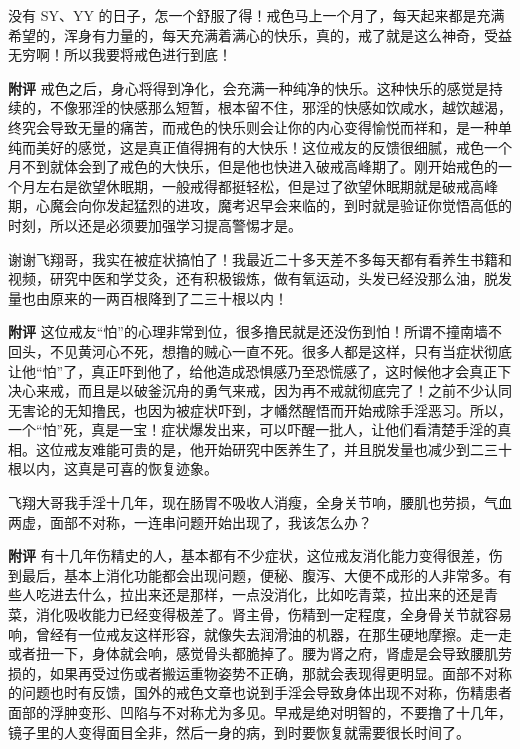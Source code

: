 \begin{case}
    没有 SY、YY 的日子，怎一个舒服了得！戒色马上一个月了，每天起来都是充满希望的，浑身有力量的，每天充满着满心的快乐，真的，戒了就是这么神奇，受益无穷啊！所以我要将戒色进行到底！

    \textbf{附评} 戒色之后，身心将得到净化，会充满一种纯净的快乐。这种快乐的感觉是持续的，不像邪淫的快感那么短暂，根本留不住，邪淫的快感如饮咸水，越饮越渴，终究会导致无量的痛苦，而戒色的快乐则会让你的内心变得愉悦而祥和，是一种单纯而美好的感觉，这是真正值得拥有的大快乐！这位戒友的反馈很细腻，戒色一个月不到就体会到了戒色的大快乐，但是他也快进入破戒高峰期了。刚开始戒色的一个月左右是欲望休眠期，一般戒得都挺轻松，但是过了欲望休眠期就是破戒高峰期，心魔会向你发起猛烈的进攻，魔考迟早会来临的，到时就是验证你觉悟高低的时刻，所以还是必须要加强学习提高警惕才是。
\end{case}

\begin{case}
    谢谢飞翔哥，我实在被症状搞怕了！我最近二十多天差不多每天都有看养生书籍和视频，研究中医和学艾灸，还有积极锻炼，做有氧运动，头发已经没那么油，脱发量也由原来的一两百根降到了二三十根以内！

    \textbf{附评} 这位戒友“怕”的心理非常到位，很多撸民就是还没伤到怕！所谓不撞南墙不回头，不见黄河心不死，想撸的贼心一直不死。很多人都是这样，只有当症状彻底让他“怕”了，真正吓到他了，给他造成恐惧感乃至恐慌感了，这时候他才会真正下决心来戒，而且是以破釜沉舟的勇气来戒，因为再不戒就彻底完了！之前不少认同无害论的无知撸民，也因为被症状吓到，才幡然醒悟而开始戒除手淫恶习。所以，一个“怕”死，真是一宝！症状爆发出来，可以吓醒一批人，让他们看清楚手淫的真相。这位戒友难能可贵的是，他开始研究中医养生了，并且脱发量也减少到二三十根以内，这真是可喜的恢复迹象。
\end{case}

\begin{case}
    飞翔大哥我手淫十几年，现在肠胃不吸收人消瘦，全身关节响，腰肌也劳损，气血两虚，面部不对称，一连串问题开始出现了，我该怎么办？

    \textbf{附评} 有十几年伤精史的人，基本都有不少症状，这位戒友消化能力变得很差，伤到最后，基本上消化功能都会出现问题，便秘、腹泻、大便不成形的人非常多。有些人吃进去什么，拉出来还是那样，一点没消化，比如吃青菜，拉出来的还是青菜，消化吸收能力已经变得极差了。肾主骨，伤精到一定程度，全身骨关节就容易响，曾经有一位戒友这样形容，就像失去润滑油的机器，在那生硬地摩擦。走一走或者扭一下，身体就会响，感觉骨头都脆掉了。腰为肾之府，肾虚是会导致腰肌劳损的，如果再受过伤或者搬运重物姿势不正确，那就会表现得更明显。面部不对称的问题也时有反馈，国外的戒色文章也说到手淫会导致身体出现不对称，伤精患者面部的浮肿变形、凹陷与不对称尤为多见。早戒是绝对明智的，不要撸了十几年，镜子里的人变得面目全非，然后一身的病，到时要恢复就需要很长时间了。
\end{case}

